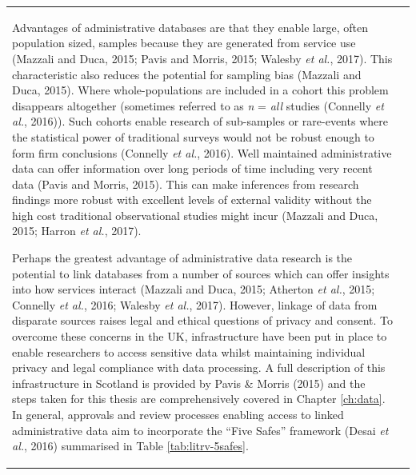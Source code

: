 \documentclass[12pt,a4paper,oneside,table]{report}
\begin{document}
\begin{tabular}[t]{ll}
Advantages of administrative databases are that they enable large, often
population sized, samples because they are generated from service use
(Mazzali and Duca, 2015; Pavis and Morris, 2015; Walesby \emph{et al.},
2017). This characteristic also reduces the potential for sampling bias
(Mazzali and Duca, 2015). Where whole-populations are included in a
cohort this problem disappears altogether (sometimes referred to as
\textit{n} = \textit{all} studies (Connelly \emph{et al.}, 2016)). Such
cohorts enable research of sub-samples or rare-events where the
statistical power of traditional surveys would not be robust enough to
form firm conclusions (Connelly \emph{et al.}, 2016). Well maintained
administrative data can offer information over long periods of time
including very recent data (Pavis and Morris, 2015). This can make
inferences from research findings more robust with excellent levels of
external validity without the high cost traditional observational
studies might incur (Mazzali and Duca, 2015; Harron \emph{et al.},
2017).

Perhaps the greatest advantage of administrative data research is the
potential to link databases from a number of sources which can offer
insights into how services interact (Mazzali and Duca, 2015; Atherton
\emph{et al.}, 2015; Connelly \emph{et al.}, 2016; Walesby \emph{et
al.}, 2017). However, linkage of data from disparate sources raises
legal and ethical questions of privacy and consent. To overcome these
concerns in the UK, infrastructure have been put in place to enable
researchers to access sensitive data whilst maintaining individual
privacy and legal compliance with data processing. A full description of
this infrastructure in Scotland is provided by Pavis \& Morris (2015)
and the steps taken for this thesis are comprehensively covered in
Chapter \ref{ch:data}. In general, approvals and review processes
enabling access to linked administrative data aim to incorporate the
``Five Safes'' framework (Desai \emph{et al.}, 2016) summarised in Table
\ref{tab:litrv-5safes}.


\end{tabular}
\end{document}

